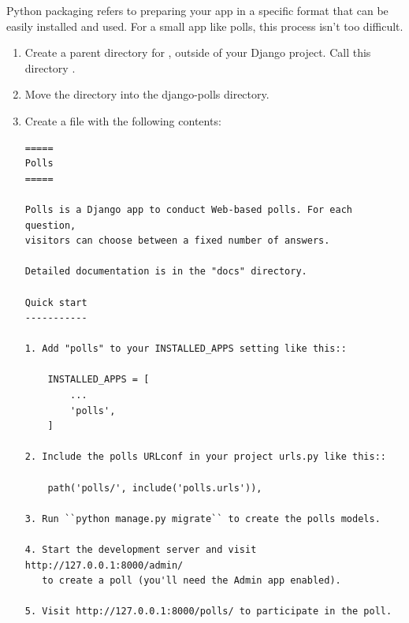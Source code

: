 Python packaging refers to preparing your app in a specific format that can be easily installed and used.
For a small app like polls, this process isn’t too difficult.


\begin{enumerate}
\item Create a parent directory for , outside of your Django project. Call this directory .
\item Move the  directory into the django-polls directory.
\item Create a file  with the following contents:
  \begin{tcolorbox}
    \tiny{
\begin{verbatim}
=====
Polls
=====

Polls is a Django app to conduct Web-based polls. For each question,
visitors can choose between a fixed number of answers.

Detailed documentation is in the "docs" directory.

Quick start
-----------

1. Add "polls" to your INSTALLED_APPS setting like this::

    INSTALLED_APPS = [
        ...
        'polls',
    ]

2. Include the polls URLconf in your project urls.py like this::

    path('polls/', include('polls.urls')),

3. Run ``python manage.py migrate`` to create the polls models.

4. Start the development server and visit http://127.0.0.1:8000/admin/
   to create a poll (you'll need the Admin app enabled).

5. Visit http://127.0.0.1:8000/polls/ to participate in the poll.

\end{verbatim}
    }
    
  \end{tcolorbox}
  

\end{enumerate}
